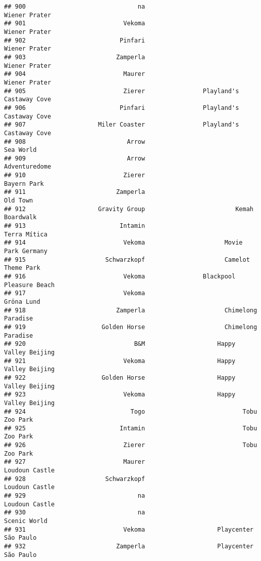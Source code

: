 \documentclass[
]{article}
\begin{document}
\begin{verbatim}
## 900                               na                           Wiener Prater
## 901                           Vekoma                           Wiener Prater
## 902                          Pinfari                           Wiener Prater
## 903                         Zamperla                           Wiener Prater
## 904                           Maurer                           Wiener Prater
## 905                           Zierer                Playland's Castaway Cove
## 906                          Pinfari                Playland's Castaway Cove
## 907                    Miler Coaster                Playland's Castaway Cove
## 908                            Arrow                               Sea World
## 909                            Arrow                           Adventuredome
## 910                           Zierer                             Bayern Park
## 911                         Zamperla                                Old Town
## 912                    Gravity Group                         Kemah Boardwalk
## 913                          Intamin                            Terra Mítica
## 914                           Vekoma                      Movie Park Germany
## 915                      Schwarzkopf                      Camelot Theme Park
## 916                           Vekoma                Blackpool Pleasure Beach
## 917                           Vekoma                              Gröna Lund
## 918                         Zamperla                      Chimelong Paradise
## 919                     Golden Horse                      Chimelong Paradise
## 920                              B&M                    Happy Valley Beijing
## 921                           Vekoma                    Happy Valley Beijing
## 922                     Golden Horse                    Happy Valley Beijing
## 923                           Vekoma                    Happy Valley Beijing
## 924                             Togo                           Tobu Zoo Park
## 925                          Intamin                           Tobu Zoo Park
## 926                           Zierer                           Tobu Zoo Park
## 927                           Maurer                          Loudoun Castle
## 928                      Schwarzkopf                          Loudoun Castle
## 929                               na                          Loudoun Castle
## 930                               na                            Scenic World
## 931                           Vekoma                    Playcenter São Paulo
## 932                         Zamperla                    Playcenter São Paulo

\end{verbatim}
\end{document}
